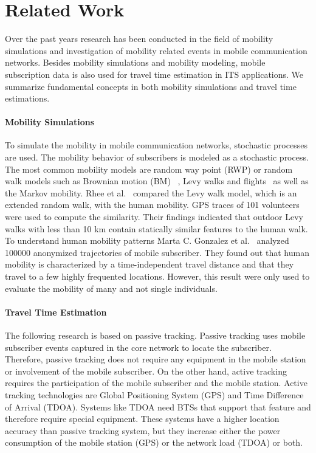 \documentclass[twocolumn]{bmcart}%
\begin{document}
\section*{Related Work}
Over the past years research has been conducted in the field of mobility simulations and investigation of mobility related events in mobile communication networks. Besides mobility simulations and mobility modeling, mobile subscription data is also used for travel time estimation in ITS applications. We summarize fundamental concepts in both mobility simulations and travel time estimations.
\paragraph*{Mobility Simulations}
To simulate the mobility in mobile communication networks, stochastic processes are used. The mobility behavior of subscribers is modeled as a stochastic process. The most common mobility models are random way point (RWP) or random walk models such as Brownian motion (BM)~\cite{Klafter1996} , Levy walks and flights~\cite{Camp2002} as well as the Markov mobility\cite{Bai2004}.
Rhee et al.~\cite{Rhee2011} compared the Levy walk model, which is an extended random walk, with the human mobility. GPS traces of 101 volunteers were used to compute the similarity. Their findings indicated that outdoor Levy walks with less than 10 km contain statically similar features to the human walk.
To understand human mobility patterns Marta C. Gonzalez et al.~\cite{Gonzalez2008} analyzed 100000 anonymized trajectories of mobile subscriber. They found out that human mobility is characterized by a time-independent travel distance and that they travel to a few highly frequented locations. However, this result were only used to evaluate the mobility of many and not single individuals.
\paragraph*{Travel Time Estimation}
The following research is based on passive tracking. Passive tracking uses mobile subscriber events captured in the core network to locate the subscriber. Therefore, passive tracking does not require any equipment in the mobile station or involvement of the mobile subscriber. On the other hand, active tracking requires the participation of the mobile subscriber and the mobile station. Active tracking technologies are Global Positioning System (GPS) and Time Difference of Arrival (TDOA). Systems like TDOA need BTSs that support that feature and therefore require special equipment. These systems have a higher location accuracy than passive tracking system, but they increase either the power consumption of the mobile station (GPS) or the network load (TDOA) or both.\newline
\end{document}

